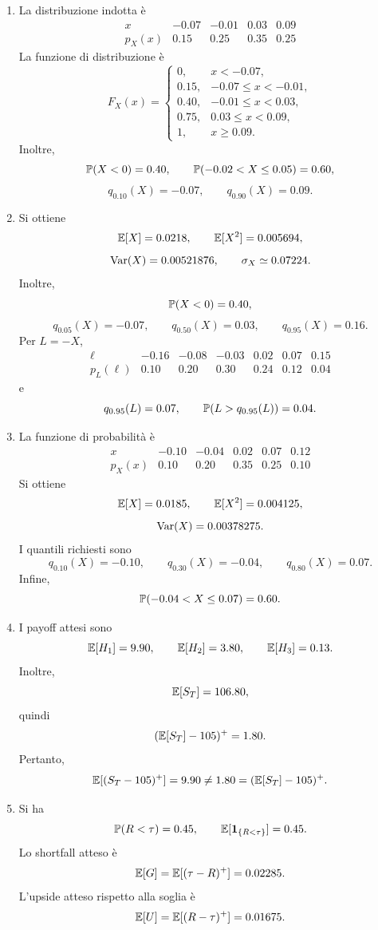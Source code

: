 \begin{enumerate}
\item
La distribuzione indotta \`{e}
\[
\begin{array}{c|cccc}
x & -0.07 & -0.01 & 0.03 & 0.09\\
\hline
p_X(x) & 0.15 & 0.25 & 0.35 & 0.25
\end{array}
\]
La funzione di distribuzione \`{e}
\[
F_X(x)=
\begin{cases}
0, & x<-0.07,\\
0.15, & -0.07\leq x<-0.01,\\
0.40, & -0.01\leq x<0.03,\\
0.75, & 0.03\leq x<0.09,\\
1, & x\geq 0.09.
\end{cases}
\]
Inoltre,
\[
\mathbb{P}(X<0)=0.40,
\qquad
\mathbb{P}(-0.02<X\leq 0.05)=0.60,
\]
\[
q_{0.10}(X)=-0.07,
\qquad
q_{0.90}(X)=0.09.
\]

\item
Si ottiene
\[
\mathbb{E}[X]=0.0218,
\qquad
\mathbb{E}[X^2]=0.005694,
\]
\[
\operatorname{Var}(X)=0.00521876,
\qquad
\sigma_X\simeq 0.07224.
\]
Inoltre,
\[
\mathbb{P}(X<0)=0.40,
\]
\[
q_{0.05}(X)=-0.07,
\qquad
q_{0.50}(X)=0.03,
\qquad
q_{0.95}(X)=0.16.
\]
Per $L=-X$,
\[
\begin{array}{c|cccccc}
\ell & -0.16 & -0.08 & -0.03 & 0.02 & 0.07 & 0.15\\
\hline
p_L(\ell) & 0.10 & 0.20 & 0.30 & 0.24 & 0.12 & 0.04
\end{array}
\]
e
\[
q_{0.95}(L)=0.07,
\qquad
\mathbb{P}(L>q_{0.95}(L))=0.04.
\]

\item
La funzione di probabilit\`{a} \`{e}
\[
\begin{array}{c|ccccc}
x & -0.10 & -0.04 & 0.02 & 0.07 & 0.12\\
\hline
p_X(x) & 0.10 & 0.20 & 0.35 & 0.25 & 0.10
\end{array}
\]
Si ottiene
\[
\mathbb{E}[X]=0.0185,
\qquad
\mathbb{E}[X^2]=0.004125,
\]
\[
\operatorname{Var}(X)=0.00378275.
\]
I quantili richiesti sono
\[
q_{0.10}(X)=-0.10,
\qquad
q_{0.30}(X)=-0.04,
\qquad
q_{0.80}(X)=0.07.
\]
Infine,
\[
\mathbb{P}(-0.04<X\leq 0.07)=0.60.
\]

\item
I payoff attesi sono
\[
\mathbb{E}[H_1]=9.90,
\qquad
\mathbb{E}[H_2]=3.80,
\qquad
\mathbb{E}[H_3]=0.13.
\]
Inoltre,
\[
\mathbb{E}[S_T]=106.80,
\]
quindi
\[
(\mathbb{E}[S_T]-105)^+=1.80.
\]
Pertanto,
\[
\mathbb{E}[(S_T-105)^+]=9.90
\neq
1.80=(\mathbb{E}[S_T]-105)^+.
\]

\item
Si ha
\[
\mathbb{P}(R<\tau)=0.45,
\qquad
\mathbb{E}[\mathbf{1}_{\{R<\tau\}}]=0.45.
\]
Lo shortfall atteso \`{e}
\[
\mathbb{E}[G]=\mathbb{E}[(\tau-R)^+]=0.02285.
\]
L'upside atteso rispetto alla soglia \`{e}
\[
\mathbb{E}[U]=\mathbb{E}[(R-\tau)^+]=0.01675.
\]


\end{enumerate}
